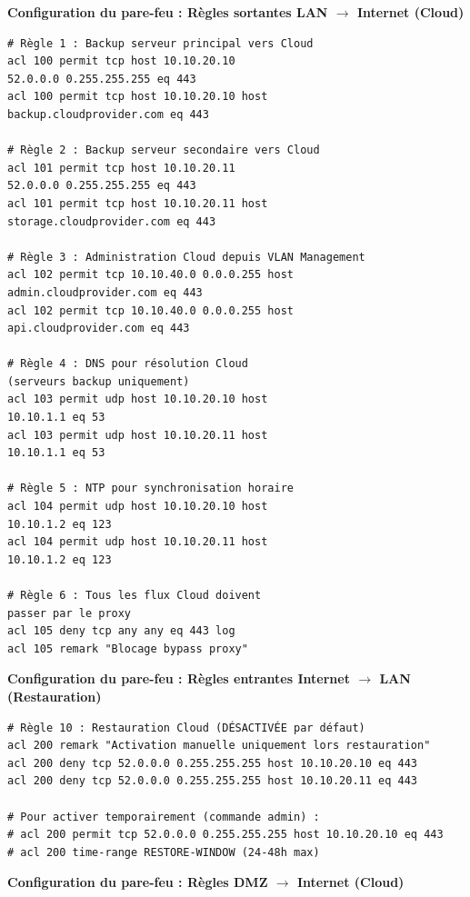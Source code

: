 \medskip

\noindent \textbf{Configuration du pare-feu : Règles sortantes LAN $\rightarrow$ Internet (Cloud)}

\begin{verbatim}
# Règle 1 : Backup serveur principal vers Cloud
acl 100 permit tcp host 10.10.20.10 
52.0.0.0 0.255.255.255 eq 443
acl 100 permit tcp host 10.10.20.10 host 
backup.cloudprovider.com eq 443

# Règle 2 : Backup serveur secondaire vers Cloud
acl 101 permit tcp host 10.10.20.11 
52.0.0.0 0.255.255.255 eq 443
acl 101 permit tcp host 10.10.20.11 host 
storage.cloudprovider.com eq 443

# Règle 3 : Administration Cloud depuis VLAN Management
acl 102 permit tcp 10.10.40.0 0.0.0.255 host 
admin.cloudprovider.com eq 443
acl 102 permit tcp 10.10.40.0 0.0.0.255 host 
api.cloudprovider.com eq 443

# Règle 4 : DNS pour résolution Cloud 
(serveurs backup uniquement)
acl 103 permit udp host 10.10.20.10 host 
10.10.1.1 eq 53
acl 103 permit udp host 10.10.20.11 host 
10.10.1.1 eq 53

# Règle 5 : NTP pour synchronisation horaire
acl 104 permit udp host 10.10.20.10 host 
10.10.1.2 eq 123
acl 104 permit udp host 10.10.20.11 host 
10.10.1.2 eq 123

# Règle 6 : Tous les flux Cloud doivent 
passer par le proxy
acl 105 deny tcp any any eq 443 log
acl 105 remark "Blocage bypass proxy"
\end{verbatim}

\newpage

\noindent \textbf{Configuration du pare-feu : Règles entrantes Internet $\rightarrow$ LAN (Restauration)}

\begin{verbatim}
# Règle 10 : Restauration Cloud (DÉSACTIVÉE par défaut)
acl 200 remark "Activation manuelle uniquement lors restauration"
acl 200 deny tcp 52.0.0.0 0.255.255.255 host 10.10.20.10 eq 443
acl 200 deny tcp 52.0.0.0 0.255.255.255 host 10.10.20.11 eq 443

# Pour activer temporairement (commande admin) :
# acl 200 permit tcp 52.0.0.0 0.255.255.255 host 10.10.20.10 eq 443
# acl 200 time-range RESTORE-WINDOW (24-48h max)
\end{verbatim}

\medskip

\noindent \textbf{Configuration du pare-feu : Règles DMZ $\rightarrow$ Internet (Cloud)}

